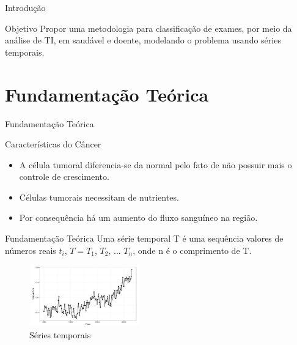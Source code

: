 \documentclass[apesctratio=169]{beamer}
\begin{document}
	\begin{frame}{Introdução}
	    \begin{block}{Objetivo}
	        Propor uma metodologia para classificação de exames, por meio da análise de TI, em saudável e doente, modelando o problema usando séries temporais.
	    
	    \end{block}
	\end{frame}
	
	\section{Fundamentação Teórica} 
	    \begin{frame}{Fundamentação Teórica}
	        \begin{block}{Características do Câncer}
	             \begin{itemize}
	                 \item A célula tumoral diferencia-se da normal pelo fato de não possuir mais o controle de crescimento.
	                 \item Células tumorais necessitam de nutrientes.
	                 \item Por consequência há um aumento do fluxo sanguíneo na região.
	             \end{itemize}
	        \end{block}
	    \end{frame}
	
    	\begin{frame}{Fundamentação Teórica}
                  Uma série temporal T é uma sequência valores de números reais $t_i$, $T = T_1$, $T_2$, ... $T_n$, onde n é o comprimento de T.
                  
                  \begin{figure}[H]
    			        \includegraphics[width=180px, height=100px]{st.PNG}
    			        \caption{Séries temporais}
    		      \end{figure}
        \end{frame}
        
\end{document}
